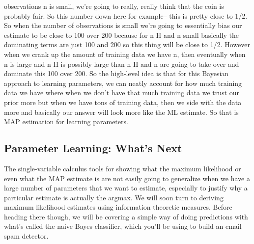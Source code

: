 \documentclass[6008notes.tex]{subfiles}
\begin{document}
observations n is small, we're going to really, really think that the coin is probably fair. So this number down here for example-- this is pretty close to 1/2. So when the number of observations is small we're going to essentially bias our estimate to be close to 100 over 200 because for n H and n small basically the dominating terms are just 100 and 200 so this thing will be close to 1/2. However when we crank up the amount of training data we have n, then eventually when n is large and n H is possibly large than n H and n are going to take over and dominate this 100 over 200. So the high-level idea is that for this Bayesian approach to learning parameters, we can neatly account for how much training data we have where when we don't have that much training data we trust our prior more but when we have tons of training data, then we side with the data more and basically our answer will look more like the ML estimate. So that is MAP estimation for learning parameters.

\subsection{Parameter Learning: What's Next}

The single-variable calculus tools for showing what the maximum likelihood or even what the MAP estimate is are not easily going to generalize when we have a large number of parameters that we want to estimate, especially to justify why a particular estimate is actually the argmax. We will soon turn to deriving maximum likelihood estimates using information theoretic measures. Before heading there though, we will be covering a simple way of doing predictions with what's called the naive Bayes classifier, which you'll be using to build an email spam detector.
\end{document}
